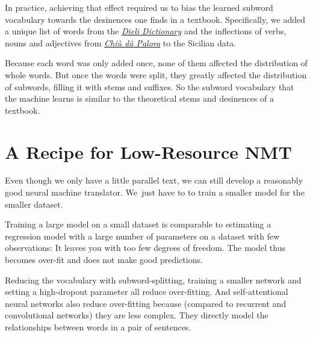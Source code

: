 \documentclass[10pt,letterpaper]{article}
\begin{document}
In practice, achieving that effect required us to bias the learned subword vocabulary towards
the desinences one finds in a textbook. Specifically, we added a unique list of words from the
\href{https://www.napizia.com/cgi-bin/sicilian.pl}{\textit{Dieli Dictionary}}
and the inflections of verbs, nouns and adjectives from
\href{https://www.napizia.com/cgi-bin/cchiu-da-palora.pl}{\textit{Chiù dâ Palora}}
to the Sicilian data.

Because each word was only added once, none of them affected the distribution of whole words.
But once the words were split, they greatly affected the distribution of subwords, filling it with stems and suffixes.
So the subword vocabulary that the machine learns is similar to the theoretical stems and desinences of a textbook.



\hypertarget{recipe}{}

\section{A Recipe for Low-Resource NMT}

Even though we only have a little parallel text, we can still 
develop a reasonably good neural machine translator.
We~just have to to train a smaller model for the smaller dataset.
      
Training a large model on a small dataset is comparable to estimating a regression
model with a large number of parameters on a dataset with few observations: 
It leaves you with too few degrees of freedom.
The model thus becomes over-fit and does not make good predictions.
      
Reducing the vocabulary with subword-splitting,
training a smaller network and setting a high-dropout parameter all reduce over-fitting.
And self-attentional neural networks also reduce over-fitting because
(compared to recurrent and convolutional networks) they are less complex.  They
directly model the relationships between words in a pair of sentences.






\end{document}
